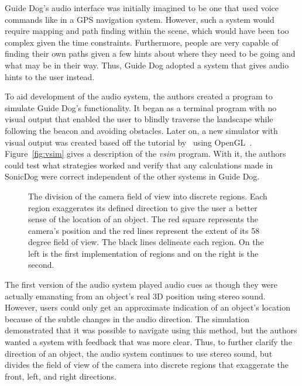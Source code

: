 Guide Dog's audio interface was initially imagined to be one that used voice
commands like in a GPS navigation system. However, such a system would require
mapping and path finding within the scene, which would have been too complex
given the time constraints. Furthermore, people are very capable of finding
their own paths given a few hints about where they need to be going and what
may be in their way. Thus, Guide Dog adopted a system that gives audio hints to
the user instead.

To aid development of the audio system, the authors created a program to
simulate Guide Dog's functionality. It began as a terminal program with no
visual output that enabled the user to blindly traverse the landscape while
following the beacon and avoiding obstacles. Later on, a new simulator with 
visual output was created based off the tutorial by~\cite{openal-tutorial} using
OpenGL~\cite{opengl-website}. Figure~\ref{fig:vsim} gives a description of the 
\emph{vsim} program. With it, the authors could test what strategies worked and
verify that any calculations made in SonicDog were correct independent of the
other systems in Guide Dog.

\begin{figure}
\caption{The division of the camera field of view into discrete regions. Each
region exaggerates its defined direction to give the user a better sense of the
location of an object. The red square represents the camera's position and the
red lines represent the extent of its 58 degree field of view. The black lines
delineate each region. On the left is the first implementation of regions and
on the right is the second.}
\label{fig:regions}
\end{figure}

The first version of the audio system played audio cues as though they were
actually emanating from an object's real 3D position using stereo sound.
However, users could only get an approximate indication of an object's location
because of the subtle changes in the audio direction. The simulation
demonstrated that it was possible to navigate using this method, but the authors
wanted a system with feedback that was more clear. Thus, to further clarify the
direction of an object, the audio system continues to use stereo sound, but
divides the field of view of the camera into discrete regions that exaggerate
the front, left, and right directions.

